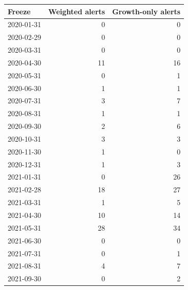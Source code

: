 \begin{longtable}{lrr}
\toprule Freeze & Weighted alerts & Growth-only alerts\\\midrule
\endhead
2020-01-31 & 0 & 0\\
2020-02-29 & 0 & 0\\
2020-03-31 & 0 & 0\\
2020-04-30 & 11 & 16\\
2020-05-31 & 0 & 1\\
2020-06-30 & 1 & 1\\
2020-07-31 & 3 & 7\\
2020-08-31 & 1 & 1\\
2020-09-30 & 2 & 6\\
2020-10-31 & 3 & 3\\
2020-11-30 & 1 & 0\\
2020-12-31 & 1 & 3\\
2021-01-31 & 0 & 26\\
2021-02-28 & 18 & 27\\
2021-03-31 & 1 & 5\\
2021-04-30 & 10 & 14\\
2021-05-31 & 28 & 34\\
2021-06-30 & 0 & 0\\
2021-07-31 & 0 & 1\\
2021-08-31 & 4 & 7\\
2021-09-30 & 0 & 2\\
\bottomrule
\end{longtable}